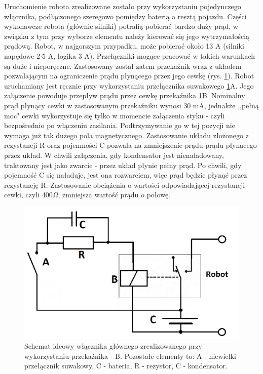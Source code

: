 Uruchomienie robota zrealizowane zostało przy wykorzystaniu pojedynczego włącznika, podłączonego szeregowo pomiędzy baterią a resztą pojazdu. Części wykonawcze robota (głównie silniki) potrafią pobierać bardzo duży prąd, w związku z tym przy wyborze elementu należy kierować się jego wytrzymałością prądową. Robot, w najgorszym przypadku, może pobierać około 13 A (silniki napędowe 2$\cdot$5 A, logika 3 A). Przełączniki mogące pracować w takich warunkach są duże i nieporęczne. Zastosowany został zatem przekaźnik wraz z układem pozwalającym na ograniczenie prądu płynącego przez jego cewkę (rys. \ref{wyla}). Robot uruchamiany jest ręcznie przy wykorzystaniu przełącznika suwakowego \ref{wyla}A. Jego załączenie powoduje przepływ prądu przez cewkę przekaźnika \ref{wyla}B. Nominalny prąd płynący cewki w zastosowanym przekaźniku wynosi 30 mA, jednakże ,,pełną moc" cewki wykorzystuje się tylko w momencie załączenia styku - czyli bezpośrednio po włączeniu zasilania. Podtrzymywanie go w tej pozycji nie wymaga już tak dużego pola magnetycznego. Zastosowanie układu złożonego z rezystancji R oraz pojemności C pozwala na zmniejszenie prądu prądu płynącego przez układ. W chwili załączenia, gdy kondensator jest nienaładowany, traktowany jest jako zwarcie - przez układ płynie pełny prąd. Po chwili, gdy pojemność C się naładuje, jest ona rozwarciem, więc prąd będzie płynąć przez rezystancję R. Zastosowanie obciążenia o wartości odpowiadającej rezystancji cewki, czyli 400$\Omega$, zmniejsza wartość prądu o połowę.

  \begin{figure}[H]
    \begin{center}
      \includegraphics[scale=0.28]{imgs/wylaczniik.png}
 	\caption[Wyłącznik główny.]{\small{Schemat ideowy włącznika głównego zrealizowanego przy wykorzystaniu przekaźnika - B. Pozostałe elementy to: A - niewielki przełącznik suwakowy, C - bateria, R - rezystor, C - kondensator.}}
	\label{wyla}
    \end{center}
  \end{figure}   
  
